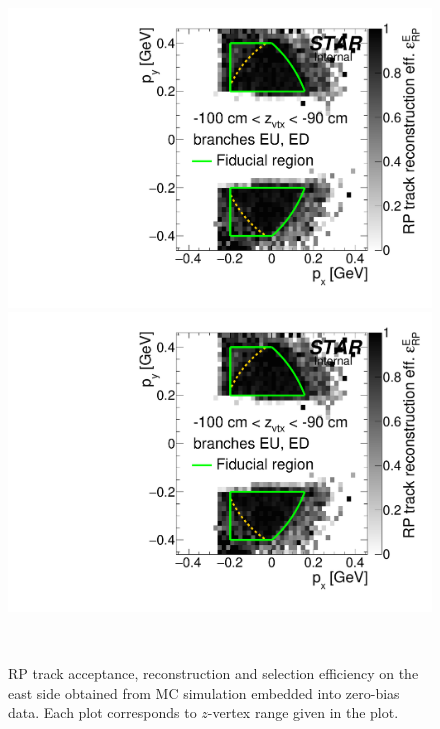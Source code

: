 \begin{figure}[hb]
\caption[RP track acceptance, reconstruction and selection efficiency on the east (MC embedded into zero-bias data).]{RP track acceptance, reconstruction and selection efficiency on the east side obtained from MC simulation embedded into zero-bias data. Each plot corresponds to $z$-vertex range given in the plot.}\label{fig:rpEffE}
\centering
\parbox{0.495\textwidth}{
  \centering
  \includegraphics[width=\linewidth,page=3]{graphics/corrections/mcFullEffPxPy.pdf}\\
  \includegraphics[width=\linewidth,page=5]{graphics/corrections/mcFullEffPxPy.pdf}
}~
\parbox{0.495\textwidth}{
  \centering
}
\end{figure}
